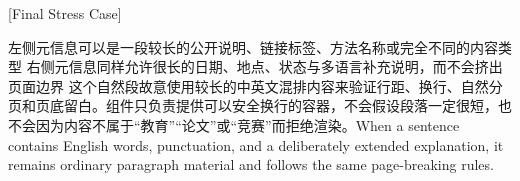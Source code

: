 [Final Stress Case]

\resumemetarow
  {左侧元信息可以是一段较长的公开说明、链接标签、方法名称或完全不同的内容类型}
  {右侧元信息同样允许很长的日期、地点、状态与多语言补充说明，而不会挤出页面边界}
\vspace{0.8mm}
这个自然段故意使用较长的中英文混排内容来验证行距、换行、自然分页和页底留白。组件只负责提供可以安全换行的容器，不会假设段落一定很短，也不会因为内容不属于“教育”“论文”或“竞赛”而拒绝渲染。When a sentence contains English words, punctuation, and a deliberately extended explanation, it remains ordinary paragraph material and follows the same page-breaking rules.
